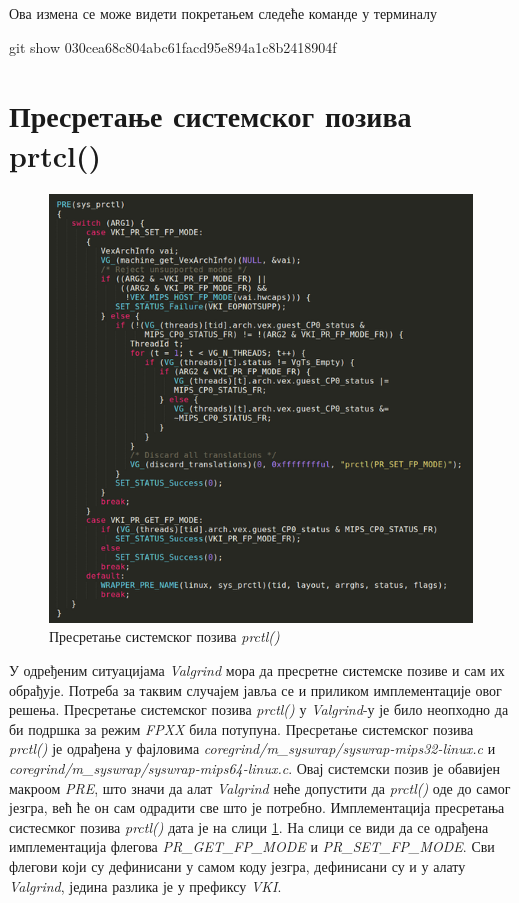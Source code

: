 \documentclass[12pt,oneside]{memoir}
\begin{document}
Ова измена се може видети покретањем следеће команде у терминалу

\begin{center}
git show 030cea68c804abc61facd95e894a1c8b2418904f
\end{center}

\section{Пресретање системског позива prtcl()}

\begin{figure}[h!]
\begin{center}
\includegraphics[scale=0.75]{slika28.png}
\end{center}
\caption{Пресретање системског позива \textit{prctl()}}
\label{fig:prctl}
\end{figure}

\indent У одређеним ситуацијама \textit{Valgrind} мора да пресретне системске позиве и сам их обрађује. Потреба за таквим случајем јавља се и приликом имплементације овог решења. Пресретање системског позива \textit{prctl()} у \textit{Valgrind}-у је било неопходно да би подршка за режим \textit{FPXX} била потупуна. Пресретање системског позива \textit{prctl()} је одрађена у фајловима \textit{coregrind/m\_syswrap/syswrap-mips32-linux.c} и \textit{coregrind/m\_syswrap/syswrap-mips64-linux.c}. Овај системски позив је обавијен макроом \textit{PRE}, што значи да алат \textit{Valgrind} неће допустити да \textit{prctl()} оде до самог језгра, већ ће он сам одрадити све што је потребно. Имплементација пресретања систесмког позива \textit{prctl()} дата је на слици \ref{fig:prctl}. На слици се види да се одрађена имплементација флегова \textit{PR\_GET\_FP\-\_MODE} и \textit{PR\_SET\_FP\-\_MODE}. Сви флегови који су дефинисани у самом коду језгра, дефинисани су и у алату \textit{Valgrind}, једина разлика је у префиксу \textit{VKI}.
\end{document}
